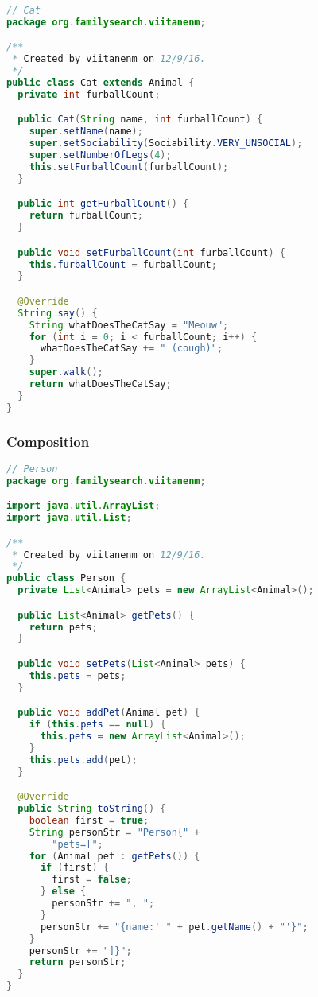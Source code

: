\begin{lstlisting}[language=Java]
// Cat
package org.familysearch.viitanenm;

/**
 * Created by viitanenm on 12/9/16.
 */
public class Cat extends Animal {
  private int furballCount;

  public Cat(String name, int furballCount) {
    super.setName(name);
    super.setSociability(Sociability.VERY_UNSOCIAL);
    super.setNumberOfLegs(4);
    this.setFurballCount(furballCount);
  }

  public int getFurballCount() {
    return furballCount;
  }

  public void setFurballCount(int furballCount) {
    this.furballCount = furballCount;
  }

  @Override
  String say() {
    String whatDoesTheCatSay = "Meouw";
    for (int i = 0; i < furballCount; i++) {
      whatDoesTheCatSay += " (cough)";
    }
    super.walk();
    return whatDoesTheCatSay;
  }
}


\end{lstlisting}

\subsubsection{Composition}\label{App:AppendixJComposition}
\begin{lstlisting}[language=Java]
// Person
package org.familysearch.viitanenm;

import java.util.ArrayList;
import java.util.List;

/**
 * Created by viitanenm on 12/9/16.
 */
public class Person {
  private List<Animal> pets = new ArrayList<Animal>();

  public List<Animal> getPets() {
    return pets;
  }

  public void setPets(List<Animal> pets) {
    this.pets = pets;
  }

  public void addPet(Animal pet) {
    if (this.pets == null) {
      this.pets = new ArrayList<Animal>();
    }
    this.pets.add(pet);
  }

  @Override
  public String toString() {
    boolean first = true;
    String personStr = "Person{" +
        "pets=[";
    for (Animal pet : getPets()) {
      if (first) {
        first = false;
      } else {
        personStr += ", ";
      }
      personStr += "{name:' " + pet.getName() + "'}";
    }
    personStr += "]}";
    return personStr;
  }
}


\end{lstlisting}

